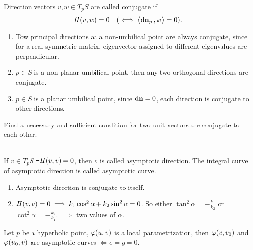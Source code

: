 \begin{definition}
    Direction vectors \(v,w\in T_p S\) are called conjugate if \[
        I\!I(v,w)=0 \quad (\iff \left<\dd{\vb{n}}_p,w\right> =0)
    .\] 
\end{definition}
\begin{example}
\begin{enumerate}[(1)]
    \item 
    Tow principal directions at a non-umbilical point are always conjugate,
    since for a real symmetric matrix, eigenvector assigned to different
    eigenvalues are perpendicular.
    \item 
    \(p\in S\) is a non-planar umbilical point, then any two orthogonal directions
    are conjugate.
    \item 
    \(p\in S\) is a planar umbilical point, since \(\dd{\vb{n}}=0\), each direction
    is conjugate to other directions.
\end{enumerate}

\begin{exercise}
    Find a necessary and sufficient condition for two unit vectors are conjugate
    to each other.
\end{exercise}

\begin{definition}\hfill\\
    If \(v\in T_p S\) \st\ \(I\!I(v,v)=0\), then \(v\) is called asymptotic
    direction. The integral curve of asymptotic direction is called asymptotic
    curve.
\end{definition}
\begin{remark}
\begin{enumerate}[(1)]
    \item Asymptotic direction is conjugate to itself.
    \item \(I\!I(v,v)=0\implies k_1\cos^2\alpha+k_2\sin^2\alpha=0\). So either
        \(\tan^2\alpha=-\frac{k_1}{k_2}\) or \(\cot^2\alpha=-\frac{k_2}{k_1}\).
        \(\implies \) two values of \(\alpha\).
\end{enumerate}
\end{remark}

\begin{exercise}
    Let \(p\) be a hyperbolic point, \(\varphi(u,v)\) is a local parametrization,
    then \(\varphi(u,v_0)\) and \(\varphi(u_0,v)\) are asymptotic curves 
    \(\iff e=g=0\).
\end{exercise}


\end{example}
